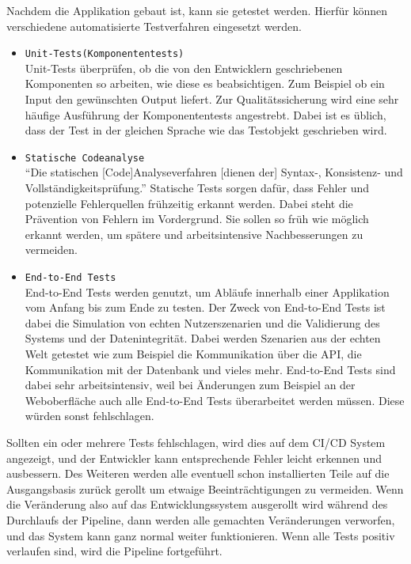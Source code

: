 Nachdem die Applikation gebaut ist, kann sie getestet werden. Hierfür können verschiedene automatisierte Testverfahren eingesetzt werden.
\begin{itemize}
	\item \texttt{Unit-Tests(Komponententests)} \\Unit-Tests überprüfen, ob die von den Entwicklern geschriebenen Komponenten so arbeiten, wie diese es beabsichtigen. Zum Beispiel ob ein Input den gewünschten Output liefert.\autocite[Vgl.][S.21]{Westphal.2012} Zur Qualitätssicherung wird eine sehr häufige Ausführung der Komponententests angestrebt. Dabei ist es üblich, dass der Test in der gleichen Sprache wie das Testobjekt geschrieben wird.
	\item  \texttt{Statische Codeanalyse}\\ \enquote{Die statischen [Code]Analyseverfahren [dienen der] Syntax-, Konsistenz- und Vollständigkeitsprüfung.}\autocite[S.264]{Bommer.2008} Statische Tests sorgen dafür, dass Fehler und potenzielle Fehlerquellen frühzeitig erkannt werden. Dabei steht die Prävention von Fehlern im Vordergrund. Sie sollen so früh wie möglich erkannt werden, um spätere und arbeitsintensive Nachbesserungen zu vermeiden.\autocite[Vgl.][S.263]{Bommer.2008}
	\item  \texttt{End-to-End Tests} \\End-to-End Tests werden genutzt, um Abläufe innerhalb einer Applikation vom Anfang bis zum Ende zu testen. Der Zweck von End-to-End Tests ist dabei die Simulation von echten Nutzerszenarien und die Validierung des Systems und der Datenintegrität.\autocite[Vgl.][S.250]{Bommer.2008} Dabei werden Szenarien aus der echten Welt getestet wie zum Beispiel die Kommunikation über die API, die Kommunikation mit der Datenbank und vieles mehr. End-to-End Tests sind dabei sehr arbeitsintensiv, weil bei Änderungen zum Beispiel an der Weboberfläche auch alle End-to-End Tests überarbeitet werden müssen. Diese würden sonst fehlschlagen.\autocite[Vgl.][S.252]{Bommer.2008}
\end{itemize}
 Sollten ein oder mehrere Tests fehlschlagen, wird dies auf dem CI/CD System angezeigt, und der Entwickler kann entsprechende Fehler leicht erkennen und ausbessern. Des Weiteren werden alle eventuell schon installierten Teile auf die Ausgangsbasis zurück gerollt um etwaige Beeinträchtigungen zu vermeiden. Wenn die Veränderung also auf das Entwicklungssystem ausgerollt wird während des Durchlaufs der Pipeline, dann werden alle gemachten Veränderungen verworfen, und das System kann ganz normal weiter funktionieren.\autocite[Vgl.][S.41]{Farley.2010} Wenn alle Tests positiv verlaufen sind, wird die Pipeline fortgeführt.\\
